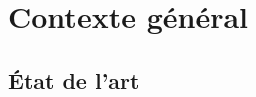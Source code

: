 \documentclass[a4paper,11pt,twoside]{memoir}
\begin{document}









\part{Contexte général}





\chapter{\'Etat de l'art}
\label{chap:articles}

\adjustmtc
\minitoc

%
%


\end{document}
